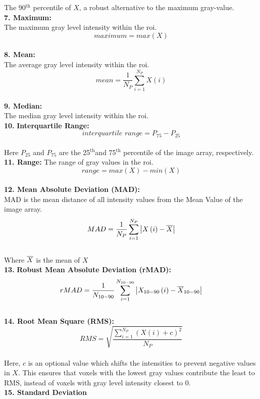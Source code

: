 The 90$^{\mathrm{th}}$ percentile of $X$, a robust alternative to the maximum gray-value. \\
\textbf{7. Maximum:}\\
The maximum gray level intensity within the \ac{roi}.\\
\[\textit{maximum}=max \left(X\right)\]\\
\textbf{8. Mean:}\\
The average gray level intensity within the \ac{roi}.\newline
\[mean=\frac{1}{N_{P}}\sum _{i=1}^{N_{P}}X\left(i\right)\]\\
\textbf{9. Median:}\\
The median gray level intensity within the \ac{roi}.\\
\textbf{10.} \textbf{Interquartile Range:}\\
\[\textit{interquartile range}=P_{75}-P_{25}\]\\
Here $P_{25}$ and $P_{75}$ {are the 25}$^{\mathrm{th}}${and 75}$^{\mathrm{th}}$ {percentile of the image array, respectively.}\\
\textbf{11. Range:}\newline
The range of gray values in the \ac{roi}.\\
\[\textit{range}=max\left(X\right)-min \left(X\right)\]\\
\textbf{12. Mean Absolute Deviation (MAD):}\\
MAD is the mean distance of all intensity values from the Mean Value of the image array.\\
\[MAD=\frac{1}{N_{P}}\sum _{i=1}^{N_{P}}\left| X\left(i\right)-\overline{X}\right|\] \\
{Where } $\overline{X}$ {is the mean of} $X$\\
\textbf{13.} \textbf{Robust Mean Absolute Deviation (rMAD):}\\
\[rMAD=\frac{1}{N_{10-90}}\sum _{i=1}^{N_{10-90}}\left| X_{10-90}\left(i\right)-\overline{X}_{10-90}\right|\] \\
\textbf{14. Root Mean Square (RMS):}\\
\[RMS=\sqrt{\frac{\sum _{i=1}^{N_{P}}\left(X\left(i\right)+c\right)^{2}}{N_{P}}}\]\\
Here, $c$ is an optional value which shifts the intensities to prevent negative values in $X$. This ensures that voxels with the lowest gray values contribute the least to RMS, instead of voxels with gray level intensity closest to 0.\\
\textbf{15. Standard Deviation}\\
